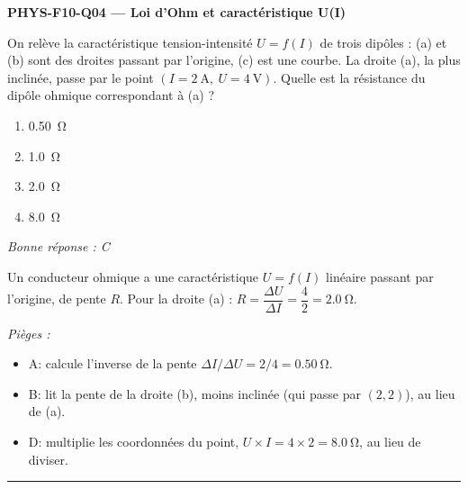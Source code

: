 \documentclass[11pt,a4paper]{article}
\begin{document}
\noindent\textbf{PHYS-F10-Q04 --- Loi d'Ohm et caractéristique U(I)}\par
On relève la caractéristique tension-intensité $U = f(I)$ de trois dipôles : (a) et (b) sont des droites passant par l'origine, (c) est une courbe. La droite (a), la plus inclinée, passe par le point $(I = \qty{2}{\ampere},\ U = \qty{4}{\volt})$. Quelle est la résistance du dipôle ohmique correspondant à (a) ?
\begin{center}
\end{center}
\begin{enumerate}[label=\Alph*)]
\item \qty{0.50}{\ohm}
\item \qty{1.0}{\ohm}
\item \qty{2.0}{\ohm}
\item \qty{8.0}{\ohm}
\end{enumerate}
\textit{Bonne réponse : C}\par
Un conducteur ohmique a une caractéristique $U = f(I)$ linéaire passant par l'origine, de pente $R$. Pour la droite (a) : $R = \dfrac{\Delta U}{\Delta I} = \dfrac{4}{2} = \qty{2.0}{\ohm}$.\par
\textit{Pièges :}
\begin{itemize}
\item A: calcule l'inverse de la pente $\Delta I/\Delta U = 2/4 = \qty{0.50}{\ohm}$.
\item B: lit la pente de la droite (b), moins inclinée (qui passe par $(2,2)$), au lieu de (a).
\item D: multiplie les coordonnées du point, $U\times I = 4\times2 = \qty{8.0}{\ohm}$, au lieu de diviser.
\end{itemize}
\vspace{8pt}\hrule\vspace{8pt}
\end{document}

